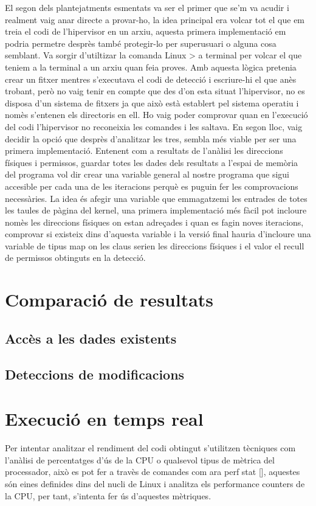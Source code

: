 ﻿\documentclass[10pt,a4paper,twocolumn,twoside]{article}
\begin{document}
El segon dels plantejatments esmentats va ser el primer que se’m va acudir i realment vaig anar directe a provar-ho, la idea principal era volcar tot el que em treia el codi de l’hipervisor en un arxiu, aquesta primera implementació em podria permetre desprès també protegir-lo per superusuari o alguna cosa semblant. Va sorgir d’utiltizar la comanda Linux > a terminal per volcar el que teniem a la terminal a un arxiu quan feia proves. Amb aquesta lògica pretenia crear un fitxer mentres s’executava el codi de detecció i escriure-hi el que anès trobant, però no vaig tenir en compte que des d’on esta situat l’hipervisor, no es disposa d’un sistema de fitxers ja que això està establert pel sistema operatiu i nomès s’entenen els directoris en ell. Ho vaig poder comprovar quan en l’execució del codi l’hipervisor no reconeixia les comandes i les saltava.
En segon lloc, vaig decidir la opció que desprès d’analitzar les tres, sembla més viable per ser una primera implementació. Entenent com a resultats de l’anàlisi les direccions físiques i permissos, guardar totes les dades dels resultats a l’espai de memòria del programa vol dir crear una variable general al nostre programa que sigui accesible per cada una de les iteracions perquè es puguin fer les comprovacions necessàries.
La idea és afegir una variable que emmagatzemi les entrades de totes les taules de pàgina del kernel, una primera implementació més fàcil pot incloure nomès les direccions físiques on estan adreçades i quan es fagin noves iteracions, comprovar si existeix dins d’aquesta variable i la versió final hauria d’incloure una variable de tipus map on les claus serien les direccions físiques i el valor el recull de permissos obtinguts en la detecció.
\section{Comparació de resultats}
\subsection{Accès a les dades existents}
\subsection{Deteccions de modificacions}

\section{Execució en temps real}
Per intentar analitzar el rendiment del codi obtingut s'utilitzen tècniques com l'anàlisi de percentatges d'ús de la CPU o qualsevol tipus de mètrica del processador, això es pot fer a travès de comandes com ara perf stat [], aquestes són eines definides dins del nucli de Linux i analitza els performance counters de la CPU, per tant, s'intenta fer ús d'aquestes mètriques.
\end{document}

